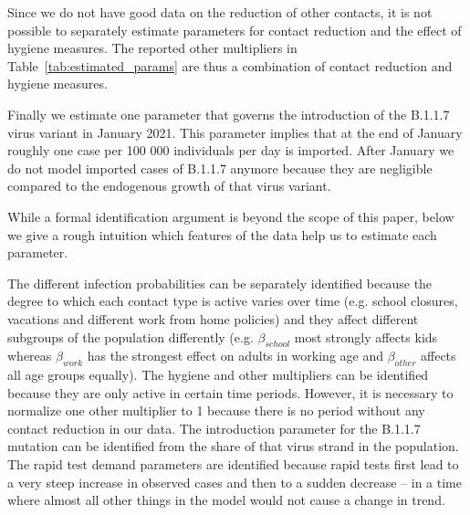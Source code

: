 Since we do not have good data on the reduction of other contacts, it is not possible
to separately estimate parameters for contact reduction and the effect of hygiene
measures. The reported other multipliers in Table~\ref{tab:estimated_params} are thus
a combination of contact reduction and hygiene measures.

Finally we estimate one parameter that governs the introduction of the B.1.1.7 virus
variant in January 2021. This parameter implies that at the end of January roughly one
case per 100 000 individuals per day is imported. After January we do not model imported
cases of B.1.1.7 anymore because they are negligible compared to the endogenous growth
of that virus variant.

While a formal identification argument is beyond the scope of this paper, below we give
a rough intuition which features of the data help us to estimate each parameter.

The different infection probabilities can be separately identified because the degree to
which each contact type is active varies over time (e.g. school closures, vacations and
different work from home policies) and they affect different subgroups of the population
differently (e.g. $\beta_{school}$ most strongly affects kids whereas
$\beta_{work}$ has the strongest effect on adults in working age and $\beta_{other}$
affects all age groups equally).
The hygiene and other multipliers can be identified because they are only active in
certain time periods. However, it is necessary to normalize one other multiplier to
1 because there is no period without any contact reduction in our data.
The introduction parameter for the B.1.1.7 mutation can be identified from the share of
that virus strand in the population. The rapid test
demand parameters are identified because rapid tests first lead to a very steep increase
in observed cases and then to a sudden decrease -- in a time where almost all other
things in the model would not cause a change in trend.